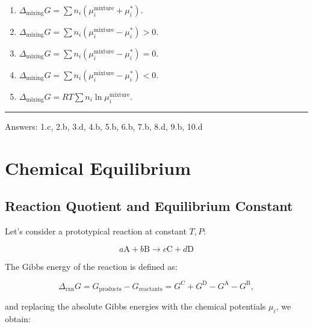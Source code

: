 \documentclass[
  9pt,
]{extbook}
\providecommand{\tightlist}{%
  \setlength{\itemsep}{0pt}\setlength{\parskip}{0pt}}
\theoremstyle{definition}
\theoremstyle{definition}
\theoremstyle{definition}
\theoremstyle{definition}
\theoremstyle{remark}
\begin{document}
\begin{enumerate}
\def\labelenumi{\alph{enumi}.}
\tightlist
\item
  \(\Delta_{\text{mixing}}G = \sum n_i(\mu_i^{\text{mixture}} + \mu_i^*)\).
\item
  \(\Delta_{\text{mixing}}G = \sum n_i(\mu_i^{\text{mixture}} - \mu_i^*) > 0\).
\item
  \(\Delta_{\text{mixing}}G = \sum n_i(\mu_i^{\text{mixture}} - \mu_i^*) = 0\).
\item
  \(\Delta_{\text{mixing}}G = \sum n_i(\mu_i^{\text{mixture}} - \mu_i^*) < 0\).
\item
  \(\Delta_{\text{mixing}}G = RT\sum n_i\ln\mu_i^{\text{mixture}}\).
\end{enumerate}

\begin{center}\rule{0.5\linewidth}{0.5pt}\end{center}

Answers: 1.c, 2.b, 3.d, 4.b, 5.b, 6.b, 7.b, 8.d, 9.b, 10.d

\renewcommand*{\standardstate}{{-\kern-6pt{\ominus}\kern-6pt-}}

\chapter{Chemical Equilibrium}\label{ChemicalEquilibrium}

\section{Reaction Quotient and Equilibrium Constant}\label{reaction-quotient-and-equilibrium-constant}

Let's consider a prototypical reaction at constant \(T,P\):

\begin{equation}
 a\mathrm{A} + b\mathrm{B} \rightarrow c\mathrm{C} + d\mathrm{D} 
\label{eq:reaction4}
\end{equation}

The Gibbs energy of the reaction is defined as:

\begin{equation}
\Delta_{\text{rxn}} G = G_{\text{products}} - G_{\text{reactants}} = G^{\text{C}} + G^{\text{D}} - G^{\text{A}}-G^{\text{B}},
\label{eq:chemeq1}
\end{equation}

and replacing the absolute Gibbs energies with the chemical potentials \(\mu_i\), we obtain:
\end{document}
